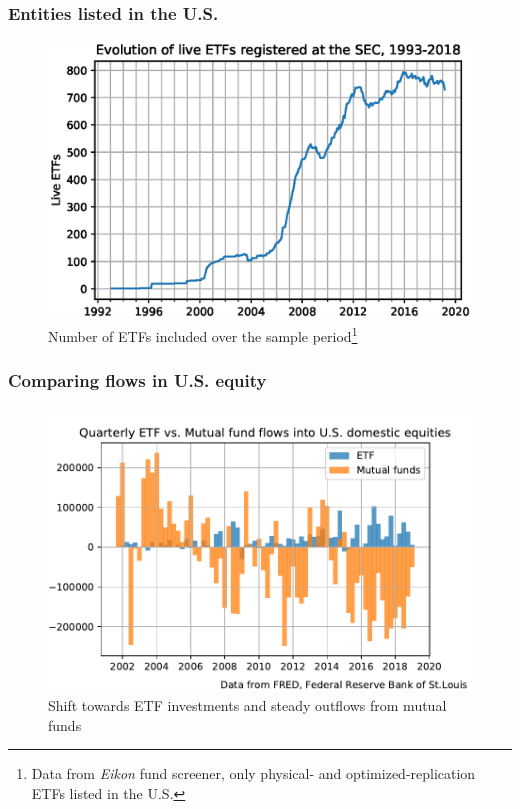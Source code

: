 \documentclass[handout, 9pt, usenames, dvipsnames]{beamer}
\begin{document}
\begin{frame}
  \frametitle{Entities listed in the U.S.}
  \begin{figure}
    \centering
    \caption{Number of ETFs included over the sample period\footnote{Data from \emph{Eikon} fund screener, only physical- and optimized-replication ETFs listed in the U.S.}}
    \includegraphics[width = \textwidth, height = 0.65\paperheight, keepaspectratio]{LiveETF_Eikon}
  \end{figure}
\end{frame}

\begin{frame}
  \frametitle{Comparing flows in U.S. equity}
  \begin{figure}
    \centering
    \caption{Shift towards ETF investments and steady outflows from mutual funds}
    \includegraphics[width = \textwidth, height = 0.65\paperheight, keepaspectratio]{USFlows_ETFvsMutual.pdf}
  \end{figure}
\end{frame}
\end{document}
